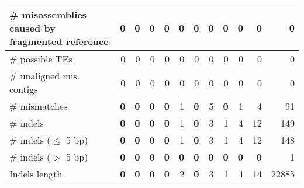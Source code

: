 \documentclass[12pt,a4paper]{article}
\begin{document}
\begin{table}[ht]
\begin{center}
\begin{tabular}{|l*{11}{|r}|}
\# misassemblies caused by fragmented reference & 0 & 0 & 0 & 0 & 0 & 0 & 0 & 0 & 0 & 0 & 0 \\ \hline
\# possible TEs & 0 & 0 & 0 & 0 & 0 & 0 & 0 & 0 & 0 & 0 & 0 \\ \hline
\# unaligned mis. contigs & 0 & 0 & 0 & 0 & 0 & 0 & 0 & 0 & 0 & 0 & 0 \\ \hline
\# mismatches & {\bf 0} & {\bf 0} & {\bf 0} & {\bf 0} & 1 & {\bf 0} & 5 & {\bf 0} & 1 & 4 & 91 \\ \hline
\# indels & {\bf 0} & {\bf 0} & {\bf 0} & {\bf 0} & 1 & {\bf 0} & 3 & 1 & 4 & 12 & 149 \\ \hline
\hspace{5mm}\# indels ($\leq$ 5 bp) & {\bf 0} & {\bf 0} & {\bf 0} & {\bf 0} & 1 & {\bf 0} & 3 & 1 & 4 & 12 & 148 \\ \hline
\hspace{5mm}\# indels ($>$ 5 bp) & {\bf 0} & {\bf 0} & {\bf 0} & {\bf 0} & {\bf 0} & {\bf 0} & {\bf 0} & {\bf 0} & {\bf 0} & {\bf 0} & 1 \\ \hline
Indels length & {\bf 0} & {\bf 0} & {\bf 0} & {\bf 0} & 2 & {\bf 0} & 3 & 1 & 4 & 14 & 22885 \\ \hline
\end{tabular}
\end{center}
\end{table}
\end{document}
